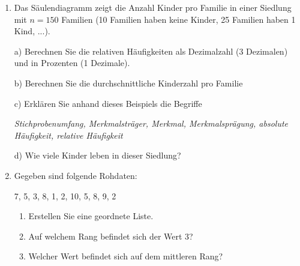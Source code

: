 \begin{enumerate}
\item Das Säulendiagramm zeigt die Anzahl Kinder pro Familie in einer Siedlung mit
$n=150$ Familien (10 Familien haben keine Kinder, 25 Familien haben 1
  Kind, ...).


a) Berechnen Sie die relativen Häufigkeiten als Dezimalzahl (3
Dezimalen) und in Prozenten (1 Dezimale).

b) Berechnen Sie die durchschnittliche Kinderzahl pro Familie

c) Erklären Sie anhand dieses Beispiels die Begriffe

\textit{Stichprobenumfang, Merkmalsträger, Merkmal, Merkmalsprägung,
  absolute Häufigkeit, relative
  Häufigkeit}

d) Wie viele Kinder leben in dieser Siedlung?

\item

  Gegeben sind folgende Rohdaten:

  7, 5, 3, 8, 1, 2, 10, 5, 8, 9, 2

  \begin{enumerate}[label=\alph*)]
  \item Erstellen Sie eine geordnete Liste.
  \item Auf welchem Rang befindet sich der Wert 3?
    \item Welcher Wert befindet sich auf dem mittleren Rang?
  \end{enumerate}

  \subsubsection{}

  
\end{enumerate}


